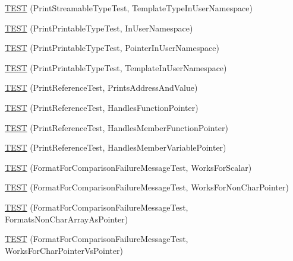 \begin{DoxyCompactItemize}
\item 
\hyperlink{namespacetesting_1_1gtest__printers__test_a8ccd96504d676671a0429073d5012ff1}{T\+E\+S\+T} (Print\+Streamable\+Type\+Test, Template\+Type\+In\+User\+Namespace)
\item 
\hyperlink{namespacetesting_1_1gtest__printers__test_a52f5df394111bcc55aecc59ce426088d}{T\+E\+S\+T} (Print\+Printable\+Type\+Test, In\+User\+Namespace)
\item 
\hyperlink{namespacetesting_1_1gtest__printers__test_a3da6191eff6b016540024c2bfccdd90b}{T\+E\+S\+T} (Print\+Printable\+Type\+Test, Pointer\+In\+User\+Namespace)
\item 
\hyperlink{namespacetesting_1_1gtest__printers__test_aa697a3cf25b7f51f26ab49ed8ac3dd31}{T\+E\+S\+T} (Print\+Printable\+Type\+Test, Template\+In\+User\+Namespace)
\item 
\hyperlink{namespacetesting_1_1gtest__printers__test_aeae9b61a9fe582c72580db1466631846}{T\+E\+S\+T} (Print\+Reference\+Test, Prints\+Address\+And\+Value)
\item 
\hyperlink{namespacetesting_1_1gtest__printers__test_aab47074bb60b087e80675a44ad8c88ba}{T\+E\+S\+T} (Print\+Reference\+Test, Handles\+Function\+Pointer)
\item 
\hyperlink{namespacetesting_1_1gtest__printers__test_a88f9089e0b19be4bda74a953d6a47d7b}{T\+E\+S\+T} (Print\+Reference\+Test, Handles\+Member\+Function\+Pointer)
\item 
\hyperlink{namespacetesting_1_1gtest__printers__test_af9c63486049ac0ec2a1db65904702eb3}{T\+E\+S\+T} (Print\+Reference\+Test, Handles\+Member\+Variable\+Pointer)
\item 
\hyperlink{namespacetesting_1_1gtest__printers__test_aa7429c3701e464d0047a82686a5e8a46}{T\+E\+S\+T} (Format\+For\+Comparison\+Failure\+Message\+Test, Works\+For\+Scalar)
\item 
\hyperlink{namespacetesting_1_1gtest__printers__test_adb093d9323bfb766be8c91215c46056e}{T\+E\+S\+T} (Format\+For\+Comparison\+Failure\+Message\+Test, Works\+For\+Non\+Char\+Pointer)
\item 
\hyperlink{namespacetesting_1_1gtest__printers__test_a3571808f93f419268b6aed1aa127ea30}{T\+E\+S\+T} (Format\+For\+Comparison\+Failure\+Message\+Test, Formats\+Non\+Char\+Array\+As\+Pointer)
\item 
\hyperlink{namespacetesting_1_1gtest__printers__test_a1694d4063da702f5379495d3cb2cbc91}{T\+E\+S\+T} (Format\+For\+Comparison\+Failure\+Message\+Test, Works\+For\+Char\+Pointer\+Vs\+Pointer)
\item 

\end{DoxyCompactItemize}
